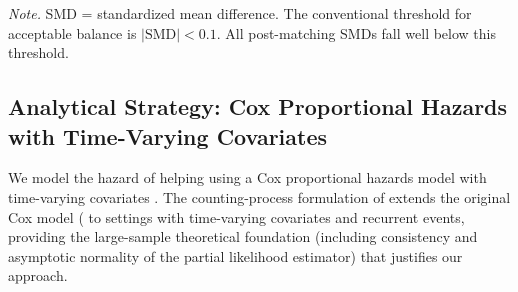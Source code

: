 \begin{table}
\caption{Covariate Balance Before and After Matching}
\label{tab:balance}
\centering\small
{}%

\vspace{0.3em}
\parbox{0.9\textwidth}{\footnotesize\textit{Note.} SMD = standardized mean difference. The conventional threshold for acceptable balance is $|\text{SMD}| < 0.1$. All post-matching SMDs fall well below this threshold.}
\end{table}

\subsection{Analytical Strategy: Cox Proportional Hazards with Time-Varying Covariates}

We model the hazard of helping using a Cox proportional hazards model with time-varying covariates \citep{andersen_gill_1982}. The counting-process formulation of \citet{andersen_gill_1982} extends the original Cox model (\citep{cox_regression_1972} to settings with time-varying covariates and recurrent events, providing the large-sample theoretical foundation (including consistency and asymptotic normality of the partial likelihood estimator) that justifies our approach.

